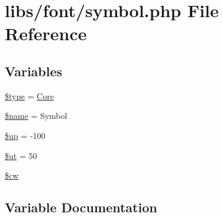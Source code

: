 \hypertarget{symbol_8php}{}\section{libs/font/symbol.php File Reference}
\label{symbol_8php}
\subsection*{Variables}
\begin{DoxyCompactItemize}
\item 
\hyperlink{symbol_8php_a9a4a6fba2208984cabb3afacadf33919}{\$type} = \textquotesingle{}\hyperlink{class_core}{Core}\textquotesingle{}
\item 
\hyperlink{symbol_8php_ab2fc40d43824ea3e1ce5d86dee0d763b}{\$name} = \textquotesingle{}Symbol\textquotesingle{}
\item 
\hyperlink{symbol_8php_a6b5ad2ac55f9df46e8f34e78fbd6f176}{\$up} = -\/100
\item 
\hyperlink{symbol_8php_aadd3f841051043ee58e587e840e8dd0b}{\$ut} = 50
\item 
\hyperlink{symbol_8php_ac2951b03dbb0317e6c61ec920b7479dc}{\$cw}
\end{DoxyCompactItemize}


\subsection{Variable Documentation}
\hypertarget{symbol_8php_ac2951b03dbb0317e6c61ec920b7479dc}{}
